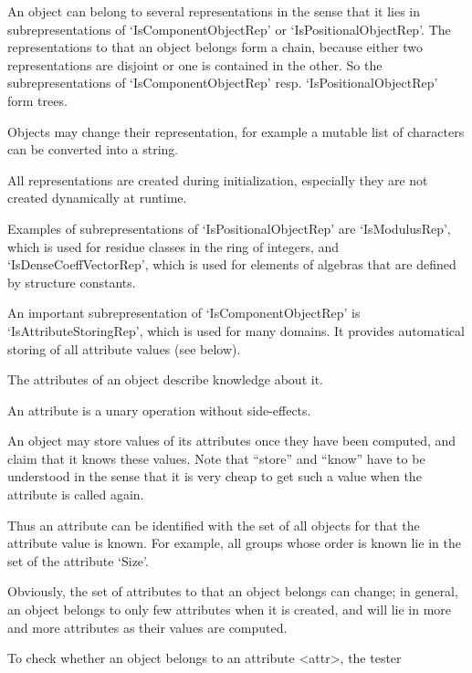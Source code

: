 An object can belong to several representations in the sense that it lies
in subrepresentations of `IsComponentObjectRep' or
`IsPositionalObjectRep'.
The representations to that an object belongs form a chain, 
because either two representations are disjoint or one is contained in
the other.
So the subrepresentations of `IsComponentObjectRep' resp.
`IsPositionalObjectRep' form trees.

Objects may change their representation,
for example a mutable list of characters can be converted into a string.

All representations are created during initialization,
especially they are not created dynamically at runtime.

Examples of subrepresentations of `IsPositionalObjectRep' are
`IsModulusRep',
which is used for residue classes in the ring of integers,
and `IsDenseCoeffVectorRep',
which is used for elements of algebras that are defined by structure
constants.

An important subrepresentation of `IsComponentObjectRep' is
`IsAttributeStoringRep', which is used for many domains.
It provides automatical storing of all attribute values (see below).


The attributes of an object describe knowledge about it.

An attribute is a unary operation without side-effects.

An object may store values of its attributes once they have been
computed, and claim that it knows these values.
Note that ``store'' and ``know'' have to be understood in the sense that 
it is very cheap to get such a value when the attribute is called again.


Thus an attribute can be identified with the set of all objects for that
the attribute value is known.
For example, all groups whose order is known lie in the set of the
attribute `Size'.

Obviously, the set of attributes to that an object belongs can change;
in general, an object belongs to only few attributes when it is created,
and will lie in more and more attributes as their values are computed.

To check whether an object belongs to an attribute <attr>,
the tester

